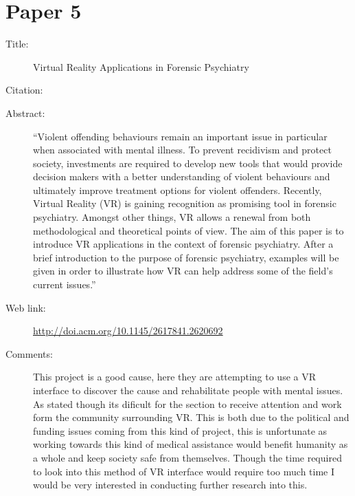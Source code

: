 \documentclass{scrartcl}
\begin{document}
	\section*{Paper 5}
	\begin{description}
		\item[Title:] Virtual Reality Applications in Forensic Psychiatry
		\item[Citation:] \cite{Benbouriche}
		\item[Abstract:] ``Violent offending behaviours remain an important issue in particular when associated with mental illness. To prevent recidivism and protect society, investments are required to develop new tools that would provide decision makers with a better understanding of violent behaviours and ultimately improve treatment options for violent offenders. Recently, Virtual Reality (VR) is gaining recognition as promising tool in forensic psychiatry. Amongst other things, VR allows a renewal from both methodological and theoretical points of view. The aim of this paper is to introduce VR applications in the context of forensic psychiatry. After a brief introduction to the purpose of forensic psychiatry, examples will be given in order to illustrate how VR can help address some of the field's current issues.''
		\item[Web link:] \url{http://doi.acm.org/10.1145/2617841.2620692}
		\item[Comments:] This project is a good cause, here they are attempting to use a VR interface to discover the cause and rehabilitate people with mental issues. As stated though its dificult for the section to receive attention and work form the community surrounding VR. This is both due to the political and funding issues coming from this kind of project, this is unfortunate as working towards this kind of medical assistance would benefit humanity as a whole and keep society safe from themselves. Though the time required to look into this method of VR interface would require too much time I would be very interested in conducting further research into this.
	\end{description}
	
\end{document}
